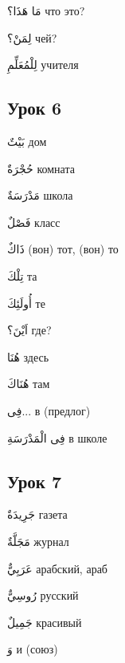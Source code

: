 \documentclass[a5paper]{article}
\newcommand\textstyleDropCaps[1]{#1}
\newcommand\textstyleCaptioncharacters[1]{#1}
\begin{document}
\textstyleCaptioncharacters{مَا هَذَا؟ }\textstyleDropCaps{что это?‎}

\textstyleCaptioncharacters{لِمَنْ؟ }\textstyleDropCaps{чей?‎}

\textstyleCaptioncharacters{لِلْمُعَلِّمِ }\textstyleDropCaps{учителя‎}

\subsection[Урок 6‎]{\textstyleDropCaps{Урок 6‎}}
\textstyleCaptioncharacters{بَيْتٌ }\textstyleDropCaps{дом‎}

\textstyleCaptioncharacters{حُجْرَةٌ }\textstyleDropCaps{комната‎}

\textstyleCaptioncharacters{مَدْرَسَةٌ }\textstyleDropCaps{школа‎}

\textstyleCaptioncharacters{فَصْلٌ }\textstyleDropCaps{класс‎}

\textstyleCaptioncharacters{ذَاكٌ }\textstyleDropCaps{(вон) тот, (вон) то‎}

\textstyleCaptioncharacters{تِلْكَ }\textstyleDropCaps{та‎}

\textstyleCaptioncharacters{أُولَئِكَ }\textstyleDropCaps{те‎}

\textstyleCaptioncharacters{اَيْنَ؟ }\textstyleDropCaps{где?‎}

\textstyleCaptioncharacters{هُنَا }\textstyleDropCaps{здесь‎}

\textstyleCaptioncharacters{هُنَاكَ }\textstyleDropCaps{там‎}

\textstyleCaptioncharacters{فِى...ِ }\textstyleDropCaps{в (предлог)‎}

\textstyleCaptioncharacters{فِى الْمَدْرَسَةِ }\textstyleDropCaps{в школе‎}

\subsection[Урок 7‎]{\textstyleDropCaps{Урок 7‎}}
\textstyleCaptioncharacters{جَرِيدَةٌ }\textstyleDropCaps{газета‎}

\textstyleCaptioncharacters{مَجَلَّةٌ }\textstyleDropCaps{журнал‎}

\textstyleCaptioncharacters{عَرَبِيٌّ }\textstyleDropCaps{арабский, араб‎}

\textstyleCaptioncharacters{رُوسِيٌّ }\textstyleDropCaps{русский‎}

\textstyleCaptioncharacters{جَمِيلٌ }\textstyleDropCaps{красивый‎}

\textstyleCaptioncharacters{وَ }\textstyleDropCaps{и (союз)‎}
\end{document}
